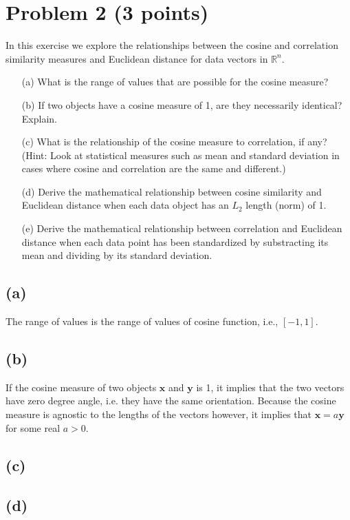 \documentclass[10pt]{article}
\begin{document}
\color{red}
\section*{Problem 2 (3 points)}
In this exercise we explore the relationships between the cosine and correlation similarity measures and Euclidean distance for data vectors in $\mathbb{R}^n$.

\begin{itemize}
\item[(a)] What is the range of values that are possible for the cosine measure?
\item[(b)] If two objects have a cosine measure of 1, are they necessarily identical? Explain.
\item[(c)] What is the relationship of the cosine measure to correlation, if any? (Hint: Look at statistical measures such as mean and standard deviation in cases where cosine and correlation are the same and different.)
\item[(d)] Derive the mathematical relationship between cosine similarity and Euclidean distance when each data object has an $L_2$ length (norm) of 1.
\item[(e)] Derive the mathematical relationship between correlation and Euclidean distance when each data point has been standardized by substracting its mean and dividing by its standard deviation.
\end{itemize}

\color{black}
\subsection*{(a)}
The range of values is the range of values of cosine function, i.e., $[-1, 1]$.

\subsection*{(b)}
If the cosine measure of two objects $\textbf{x}$ and $\textbf{y}$ is 1, it implies that the two vectors have zero degree angle, i.e. they have the same orientation. Because the cosine measure is agnostic to the lengths of the vectors however, it implies that $\textbf{x} = a\textbf{y}$ for some real $a > 0$.

\subsection*{(c)}

\subsection*{(d)}
\end{document}
